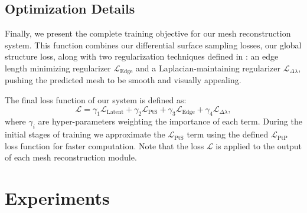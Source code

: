 \documentclass{article}
\begin{document}
\subsection{Optimization Details}

Finally, we present the complete training objective for our mesh reconstruction system. This function combines our differential surface sampling losses, our global structure loss, along with two regularization techniques defined in \citet{Pixel2Mesh}: an edge length minimizing regularizer $\mathcal{L}_{\text{Edge}}$ and a Laplacian-maintaining regularizer $\mathcal{L}_{\Delta \lambda}$, pushing the predicted mesh to be smooth and visually appealing. 


The final loss function of our system is defined as: 
\begin{equation}
\mathcal{L} = \gamma_1  \mathcal{L}_{\text{Latent}} + \gamma_2  \mathcal{L}_{\text{PtS}} 
+ \gamma_3  \mathcal{L}_{\text{Edge}} + \gamma_4  \mathcal{L}_{\Delta \lambda}, \label{eq:1}          
\end{equation}
where $\gamma_i$ are hyper-parameters weighting the importance of each term. During the initial stages of training we approximate the $\mathcal{L}_{\text{PtS}}$ term using the defined $\mathcal{L}_{\text{PtP}}$ loss function for faster computation. Note that the loss $\mathcal{L}$ is applied to the output of each mesh reconstruction module. 

\section{Experiments}
\end{document}
